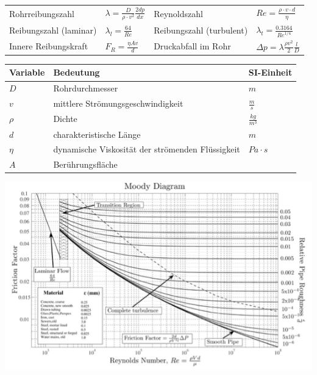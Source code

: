 \documentclass[
a4paper,
oneside,
landscape, 
8pt,
]{scrartcl}
\begin{document}
\begin{multicols*}{2}
\begin{tabbing}
	\begin{tabu} to \linewidth {l X l X}
		\toprule
		Rohrreibungszahl & $\lambda = \frac{D}{\rho \cdot v^2} \frac{2dp}{dx} $  &
		Reynoldszahl & $Re = \frac{\rho \cdot v \cdot d}{\eta}$ \\
		Reibungszahl (laminar) & $\lambda_l = \frac{64}{Re}$ &
		Reibungszahl (turbulent) & $\lambda_t = \frac{0.3164}{Re^{1/4}}$ \\
		Innere Reibungskraft & $F_R = \frac{\eta A v}{d}$ &
		Druckabfall im Rohr & $\Delta p = \lambda \frac{\rho v^2}{2} \frac{l}{D}$ \\
	\end{tabu}
\end{tabbing}

\begin{tabbing}
	\begin{tabu} to \linewidth {l X l}
		Variable & Bedeutung & SI-Einheit \\
		\midrule
		$D$ & Rohrdurchmesser & $m$ \\
		$v$ & mittlere Strömungsgeschwindigkeit & $\frac{m}{s}$  \\
		$\rho$ & Dichte & $\frac{kg}{m^3}$ \\
		$d$ & charakteristische Länge  & $m$ \\
		$\eta$ & dynamische Viskosität der strömenden Flüssigkeit & $Pa \cdot s$ \\
		$A$ & Berührungsfläche & \\
		\bottomrule
	\end{tabu}
\end{tabbing}

\includegraphics[width=0.8\linewidth]{images/moody_diagram}

\vfill\null
\columnbreak



\end{multicols*}
\end{document}
